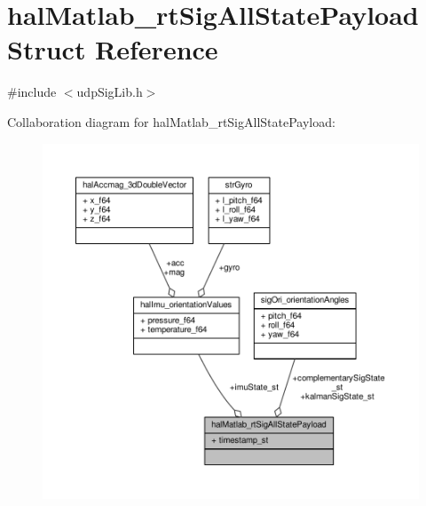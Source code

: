 \hypertarget{structhalMatlab__rtSigAllStatePayload}{\section{hal\+Matlab\+\_\+rt\+Sig\+All\+State\+Payload Struct Reference}
\label{structhalMatlab__rtSigAllStatePayload}
}


{\ttfamily \#include $<$udp\+Sig\+Lib.\+h$>$}



Collaboration diagram for hal\+Matlab\+\_\+rt\+Sig\+All\+State\+Payload\+:
\nopagebreak
\begin{figure}[H]
\begin{center}
\leavevmode
\includegraphics[width=350pt]{structhalMatlab__rtSigAllStatePayload__coll__graph}
\end{center}
\end{figure}
